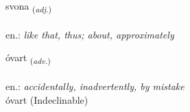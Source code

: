 \documentclass[frontgrid, backgrid]{flacards}\usepackage[]{graphicx}\usepackage[]{xcolor}
\begin{document}
\renewcommand{\flhead}{\vskip5pt \fboxsep=0pt {\small\bfseries\footnotesize Lýsingarorð | Adjective}}
\renewcommand{\fcfoot}{\vskip5pt \fboxsep=0pt \hspace{2pt}{\small\bfseries\footnotesize 2K}}

\renewcommand{\blhead}{\vskip5pt {\small\bfseries\footnotesize Lýsingarorð | Adjective }}
\renewcommand{\bcfoot}{\vskip5pt \hspace{2pt}{\small\bfseries\footnotesize 2K}}


{svona \small{\textsubscript{(\textit{adj.})}} \\[1ex] %
\textphonetic{[svɔːna]} \\
en.: \emph{like that, thus; about, approximately} \\  [2ex]
\renewcommand*{\arraystretch}{0.8}
}


\renewcommand{\flhead}{\vskip5pt \fboxsep=0pt {\small\bfseries\footnotesize Atviksorð | Adverb}}
\renewcommand{\fcfoot}{\vskip5pt \fboxsep=0pt \hspace{2pt}{\small\bfseries\footnotesize 2K}}

\renewcommand{\blhead}{\vskip5pt {\small\bfseries\footnotesize Atviksorð | Adverb }}
\renewcommand{\bcfoot}{\vskip5pt \hspace{2pt}{\small\bfseries\footnotesize 2K}}


{óvart \small{\textsubscript{(\textit{adv.})}} \\[1ex]
\textphonetic{[ouːvar̥t]} \\
en.: \emph{accidentally, inadvertently, by mistake} \\  [2ex]
óvart (Indeclinable)}
\end{document}
